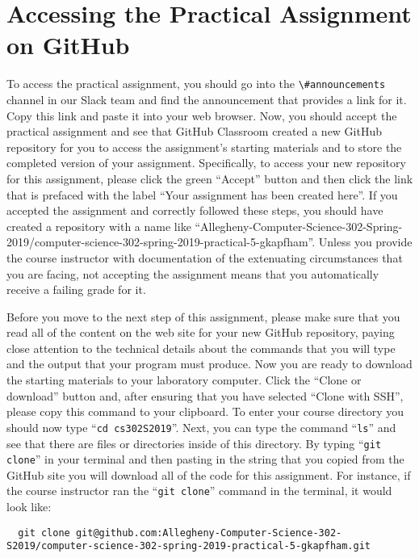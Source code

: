 \documentclass[11pt]{article}
\newcommand{\command}[1]{``\lstinline{#1}''}
\newcommand{\channel}[1]{\lstinline{#1}}
\begin{document}
\section*{Accessing the Practical Assignment on GitHub}

To access the practical assignment, you should go into the \channel{\#announcements} channel in our Slack team and find
the announcement that provides a link for it. Copy this link and paste it into your web browser. Now, you should accept
the practical assignment and see that GitHub Classroom created a new GitHub repository for you to access the
assignment's starting materials and to store the completed version of your assignment. Specifically, to access your new
repository for this assignment, please click the green ``Accept'' button and then click the link that is prefaced with
the label ``Your assignment has been created here''. If you accepted the assignment and correctly followed these steps,
you should have created a repository with a name like
``Allegheny-Computer-Science-302-Spring-2019/computer-science-302-spring-2019-practical-5-gkapfham''. Unless you provide
the course instructor with documentation of the extenuating circumstances that you are facing, not accepting the
assignment means that you automatically receive a failing grade for it.

Before you move to the next step of this assignment, please make sure that you read all of the content on the web site
for your new GitHub repository, paying close attention to the technical details about the commands that you will type
and the output that your program must produce. Now you are ready to download the starting materials to your laboratory
computer. Click the ``Clone or download'' button and, after ensuring that you have selected ``Clone with SSH'', please
copy this command to your clipboard. To enter your course directory you should now type \command{cd cs302S2019}. Next,
you can type the command \command{ls} and see that there are files or directories inside of this directory. By typing
\command{git clone} in your terminal and then pasting in the string that you copied from the GitHub site you will
download all of the code for this assignment. For instance, if the course instructor ran the \command{git clone} command
in the terminal, it would look like:

\begin{lstlisting}
  git clone git@github.com:Allegheny-Computer-Science-302-S2019/computer-science-302-spring-2019-practical-5-gkapfham.git
\end{lstlisting}
\end{document}
